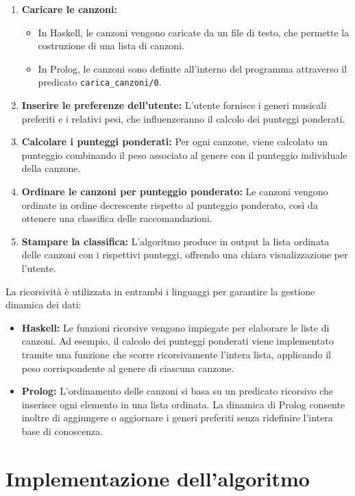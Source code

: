 \documentclass[a4paper,11pt]{article}
\begin{document}
\begin{enumerate}
    \item \textbf{Caricare le canzoni:} 
    \begin{itemize}
        \item In Haskell, le canzoni vengono caricate da un file di testo, che permette la costruzione di una lista di canzoni.
        \item In Prolog, le canzoni sono definite all’interno del programma attraverso il predicato \texttt{carica\_canzoni/0}.
    \end{itemize}
    \item \textbf{Inserire le preferenze dell'utente:} 
    L’utente fornisce i generi musicali preferiti e i relativi pesi, che influenzeranno il calcolo dei punteggi ponderati.
    \item \textbf{Calcolare i punteggi ponderati:} 
    Per ogni canzone, viene calcolato un punteggio combinando il peso associato al genere con il punteggio individuale della canzone.
    \item \textbf{Ordinare le canzoni per punteggio ponderato:} 
    Le canzoni vengono ordinate in ordine decrescente rispetto al punteggio ponderato, così da ottenere una classifica delle raccomandazioni.
    \item \textbf{Stampare la classifica:} 
    L’algoritmo produce in output la lista ordinata delle canzoni con i rispettivi punteggi, offrendo una chiara visualizzazione per l’utente.
\end{enumerate}

La ricorsività è utilizzata in entrambi i linguaggi per garantire la gestione dinamica dei dati:

\begin{itemize}
    \item \textbf{Haskell:} 
    Le funzioni ricorsive vengono impiegate per elaborare le liste di canzoni. Ad esempio, il calcolo dei punteggi ponderati viene implementato tramite una funzione che scorre ricorsivamente l’intera lista, applicando il peso corrispondente al genere di ciascuna canzone.
    \item \textbf{Prolog:} 
    L’ordinamento delle canzoni si basa su un predicato ricorsivo che inserisce ogni elemento in una lista ordinata. La dinamica di Prolog consente inoltre di aggiungere o aggiornare i generi preferiti senza ridefinire l’intera base di conoscenza.
\end{itemize}

\newpage
\section{Implementazione dell'algoritmo}
\end{document}
